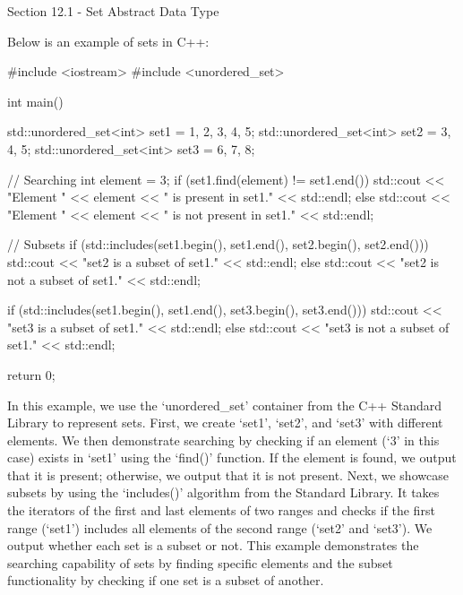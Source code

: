 \begin{notes}{Section 12.1 - Set Abstract Data Type}
    \begin{highlight}
        Below is an example of sets in C++:
    
    \begin{code}[C++]
    #include <iostream>
    #include <unordered_set>
    
    int main() {
        std::unordered_set<int> set1 = {1, 2, 3, 4, 5};
        std::unordered_set<int> set2 = {3, 4, 5};
        std::unordered_set<int> set3 = {6, 7, 8};
    
        // Searching
        int element = 3;
        if (set1.find(element) != set1.end()) {
            std::cout << "Element " << element << " is present in set1." 
            << std::endl;
        } else {
            std::cout << "Element " << element << " is not present in set1." 
            << std::endl;
        }
    
        // Subsets
        if (std::includes(set1.begin(), set1.end(), set2.begin(), set2.end())) {
            std::cout << "set2 is a subset of set1." << std::endl;
        } else {
            std::cout << "set2 is not a subset of set1." << std::endl;
        }
    
        if (std::includes(set1.begin(), set1.end(), set3.begin(), set3.end())) {
            std::cout << "set3 is a subset of set1." << std::endl;
        } else {
            std::cout << "set3 is not a subset of set1." << std::endl;
        }
    
        return 0;
    }
    \end{code}
        In this example, we use the `unordered\_set' container from the C++ Standard Library to represent sets. First, we create `set1', `set2', and `set3' with different elements. We then demonstrate searching by checking if an element (`3' in this case) exists in `set1' using the `find()' function. If the element is found, we output that it 
        is present; otherwise, we output that it is not present. Next, we showcase subsets by using the `includes()' algorithm from the Standard Library. It takes the iterators of the first and last elements of two ranges and checks if the first range (`set1') includes all elements of the second range (`set2' and `set3'). We output whether 
        each set is a subset or not. This example demonstrates the searching capability of sets by finding specific elements and the subset functionality by checking if one set is a subset of another.
    \end{highlight}
\end{notes}

